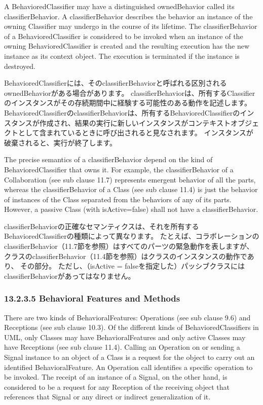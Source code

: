 \documentclass[a4paper,11pt]{ltjsarticle}
\begin{document}
A BehavioredClassifier may have a distinguished ownedBehavior called its classifierBehavior. 
A classifierBehavior describes the behavior an instance of the owning Classifier may undergo in the course of its lifetime. 
The classifierBehavior of a BehavioredClassifier is considered to be invoked when an instance of the owning BehavioredClassifier is created and the resulting execution has the new instance as its context object. 
The execution is terminated if the instance is destroyed.

BehavioredClassifierには、そのclassifierBehaviorと呼ばれる区別されるownedBehaviorがある場合があります。
classifierBehaviorは、所有するClassifierのインスタンスがその存続期間中に経験する可能性のある動作を記述します。
BehavioredClassifierのclassifierBehaviorは、所有するBehavioredClassifierのインスタンスが作成され、結果の実行に新しいインスタンスがコンテキストオブジェクトとして含まれているときに呼び出されると見なされます。
インスタンスが破棄されると、実行が終了します。

The precise semantics of a classifierBehavior depend on the kind of BehavioredClassifier that owns it. 
For example, the classifierBehavior of a Collaboration (see sub clause 11.7) represents emergent behavior of all the parts, whereas the classifierBehavior of a Class (see sub clause 11.4) is just the behavior of instances of the Class separated from the behaviors of any of its parts. 
However, a passive Class (with isActive=false) shall not have a classifierBehavior.

classifierBehaviorの正確なセマンティクスは、それを所有するBehavioredClassifierの種類によって異なります。
たとえば、コラボレーションのclassifierBehavior（11.7節を参照）はすべてのパーツの緊急動作を表しますが、クラスのclassifierBehavior（11.4節を参照）はクラスのインスタンスの動作であり、 その部分。
ただし、（isActive = falseを指定した）パッシブクラスにはclassifierBehaviorがあってはなりません。

\subsubsection*{13.2.3.5 Behavioral Features and Methods}

There are two kinds of BehavioralFeatures: Operations (see sub clause 9.6) and Receptions (see sub clause 10.3). 
Of the different kinds of BehavioredClassifiers in UML, only Classes may have BehavioralFeatures and only active Classes may have Receptions (see sub clause 11.4). 
Calling an Operation on or sending a Signal instance to an object of a Class is a request for the object to carry out an identified BehavioralFeature. 
An Operation call identifies a specific operation to be invoked. 
The receipt of an instance of a Signal, on the other hand, is considered to be a request for any Reception of the receiving object that references that Signal or any direct or indirect generalization of it.
\end{document}
